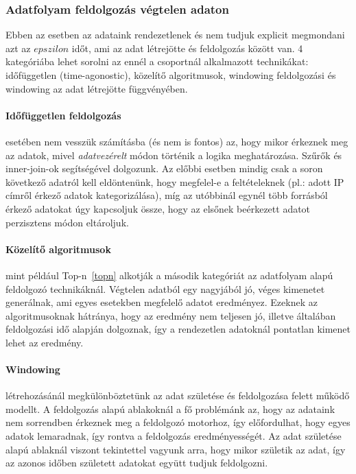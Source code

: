 \documentclass[a4paper,12pt]{article}
\begin{document}
\subsubsection{Adatfolyam feldolgozás végtelen adaton}
Ebben az esetben az adataink rendezetlenek és nem tudjuk explicit megmondani azt az $epszilon$ időt, ami az adat létrejötte és feldolgozás között van. 4 kategóriába lehet sorolni az ennél a csoportnál alkalmazott technikákat: időfüggetlen (time-agonostic), közelítő algoritmusok, windowing feldolgozási és windowing az adat létrejötte függvényében. 

\paragraph{Időfüggetlen feldolgozás} esetében nem vesszük számításba (és nem is fontos) az, hogy mikor érkeznek meg az adatok, mivel \textsl{adatvezérelt} módon történik a logika meghatározása. Szűrők és inner-join-ok segítségével dolgozunk. Az előbbi esetben mindig csak a soron következő adatról kell eldöntenünk, hogy megfelel-e a feltételeknek (pl.: adott IP címről érkező adatok kategorizálása), míg az utóbbinál egynél több forrásból érkező adatokat úgy kapcsoljuk össze, hogy az elsőnek beérkezett adatot perzisztens módon eltároljuk. 

\paragraph{Közelítő algoritmusok} mint például Top-n~\ref{topn} alkotják a második kategóriát az adatfolyam alapú feldolgozó technikáknál. Végtelen adatból egy nagyjából jó, véges kimenetet generálnak, ami egyes esetekben megfelelő adatot eredményez. Ezeknek az algoritmusoknak hátránya, hogy az eredmény nem teljesen jó, illetve általában feldolgozási idő alapján dolgoznak, így a rendezetlen adatoknál pontatlan kimenet lehet az eredmény.

\paragraph{Windowing} létrehozásánál megkülönböztetünk az adat születése és feldolgozása felett működő modellt. A feldolgozás alapú ablakoknál a fő problémánk az, hogy az adataink nem sorrendben érkeznek meg a feldolgozó motorhoz, így előfordulhat, hogy egyes adatok lemaradnak, így rontva a feldolgozás eredményességét. Az adat születése alapú ablaknál viszont tekintettel vagyunk arra, hogy mikor születik az adat, így az azonos időben született adatokat együtt tudjuk feldolgozni.
\end{document}
